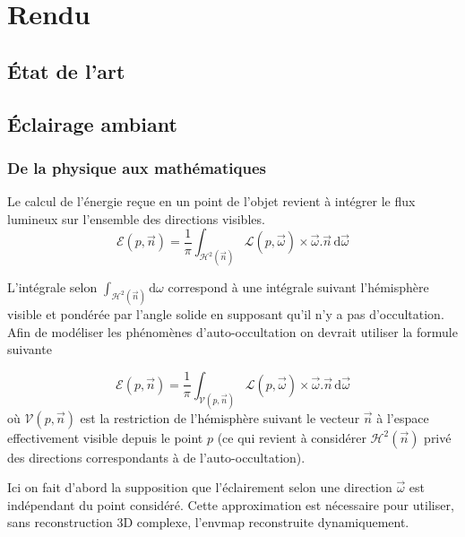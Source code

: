 \documentclass[10pt,a4paper,twoside, twocolumn]{report}
\begin{document}
\iftwocolumn \twocolumn \else \onecolumn \fi


\chapter{Rendu}


\section{État de l’art}


\section{Éclairage ambiant}\label{section:ambiant}

\subsection{De la physique aux mathématiques}
Le calcul de l’énergie reçue en un point de l’objet revient à intégrer le flux lumineux sur l’ensemble des directions visibles.
\begin{equation}
	\mathcal E(p, \vec n)=\frac{1}{\pi}\int_{\mathcal{H}^2(\vec{n})}\mathcal L(p,\vec\omega)\times\vec\omega.\vec n\, \mathrm d\vec\omega
\end{equation}

L’intégrale selon $\int_{\mathcal{H}^2(\vec n)}\mathrm d\omega$ correspond à une intégrale suivant l’hémisphère visible et pondérée par l’angle solide en supposant qu’il n’y a pas d’occultation. Afin de modéliser les phénomènes d’auto-occultation on devrait utiliser la formule suivante

\begin{equation}
	\mathcal E(p, \vec n)=\frac{1}{\pi}\int_{\mathcal V(p, \vec n )}\mathcal L(p, \vec\omega)\times\vec\omega.\vec n\, \mathrm d\vec\omega
\end{equation}
où $\mathcal V(p, \vec n)$ est la restriction de l’hémisphère suivant le vecteur $\vec n$ à l’espace effectivement visible depuis le point $p$ (ce qui revient à considérer $\mathcal H^2(\vec n)$ privé des directions correspondants à de l’auto-occultation).

Ici on fait d’abord la supposition que l’éclairement selon une direction $\vec{\omega}$ est indépendant du point considéré. Cette approximation est nécessaire pour utiliser, sans reconstruction 3D complexe, l’envmap reconstruite dynamiquement.
\end{document}
